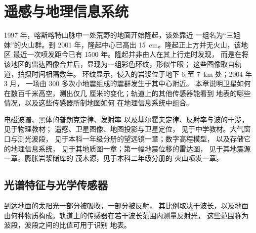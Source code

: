 \chapter{遥感与地理信息系统}\label{ch:b3:remote-sensing-gis}

1997 年，喀斯喀特山脉中一处荒野的地面开始隆起，该处靠近
一组名为“三姐妹”的火山群。到 2001 年，隆起中心已高出
\qty{15}{cm}。隆起正上方并无火山，该地区
最近一次喷发距今已有 1500 年。隆起并非由人在其上行走时发现，
而是在将该地区的雷达图像合并后，显现为一组彩色环纹，形似牛眼；
这些图像取自轨道，拍摄时间相隔数年。
环纹显示，侵入的岩浆位于地下 6 至 \qty{7}{km} 处；2004 年 3 月，
一场由 300 多次小地震组成的震群发生于其中心附近。
本章说明卫星如何在数百千米高空，测出仅几
厘米的变化；轨道上的其他传感器能看到
地表的哪些情况，以及这些传感器所制地图如何
在地理信息系统中组合。

\begin{recall}
电磁波谱、黑体的普朗克定律、发射率
以及基尔霍夫定律、反射率与波的干涉，见于物理教材；
遥感、卫星图像、地图投影与卫星定位，
见于中学教材。大气窗口与测光波段，
见于本科一年级分册的望远镜一章；数字高程模型，
以及存储它的地理信息系统，
见于其地质图一章；第一幅地震位移的雷达图，
见于其地震源一章。膨胀岩浆储库的
茂木源，见于本科二年级分册的
火山喷发一章。
\end{recall}

\section{光谱特征与光学传感器}\label{sec:b3:remote-sensing-gis:optical}

到达地面的太阳光一部分被吸收，一部分被反射，
其比例取决于波长，以及地面
由何种物质构成。轨道上的传感器在若干波长范围内测量反射光，
这些范围称为波段，波段之间的比值可用于识别
地表。

